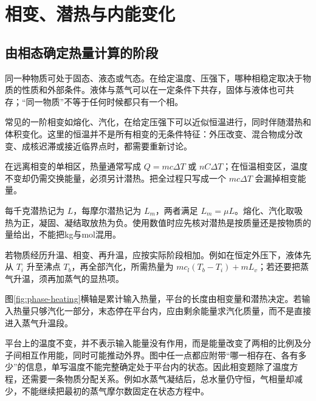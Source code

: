 \section{相变、潜热与内能变化}
\subsection{由相态确定热量计算的阶段}
同一种物质可处于固态、液态或气态。在给定温度、压强下，哪种相稳定取决于物质的性质和外部条件。液体与蒸气可以在一定条件下共存，固体与液体也可共存；“同一物质”不等于任何时候都只有一个相。

常见的一阶相变如熔化、汽化，在给定压强下可以近似恒温进行，同时伴随潜热和体积变化。这里的恒温并不是所有相变的无条件特征：外压改变、混合物成分改变、成核迟滞或接近临界点时，都需要重新讨论。

在远离相变的单相区，热量通常写成 $Q=mc\Delta T$ 或 $nC\Delta T$；在恒温相变区，温度不变却仍需交换能量，必须另计潜热。把全过程只写成一个 $mc\Delta T$ 会漏掉相变能量。


每千克潜热记为 $L$，每摩尔潜热记为 $L_m$，两者满足 $L_m=\mu L$。熔化、汽化取吸热为正，凝固、凝结取放热为负。使用数值时应先核对潜热是按质量还是按物质的量给出，不能把kg与mol混用。

若物质经历升温、相变、再升温，应按实际阶段相加。例如在恒定外压下，液体先从 $T_i$ 升至沸点 $T_b$，再全部汽化，所需热量为 $mc_l(T_b-T_i)+mL_v$；若还要把蒸气升温，须再加蒸气的显热项。


图\ref{fig:phase-heating}横轴是累计输入热量，平台的长度由相变量和潜热决定。若输入热量只够汽化一部分，末态停在平台内，应由剩余能量求汽化质量，而不是直接进入蒸气升温段。

平台上的温度不变，并不表示输入能量没有作用，而是能量改变了两相的比例及分子间相互作用能，同时可能推动外界。图中任一点都应附带“哪一相存在、各有多少”的信息，单写温度不能完整确定处于平台内的状态。因此相变题除了温度方程，还需要一条物质分配关系。例如水蒸气凝结后，总水量仍守恒，气相量却减少，不能继续把最初的蒸气摩尔数固定在状态方程中。

